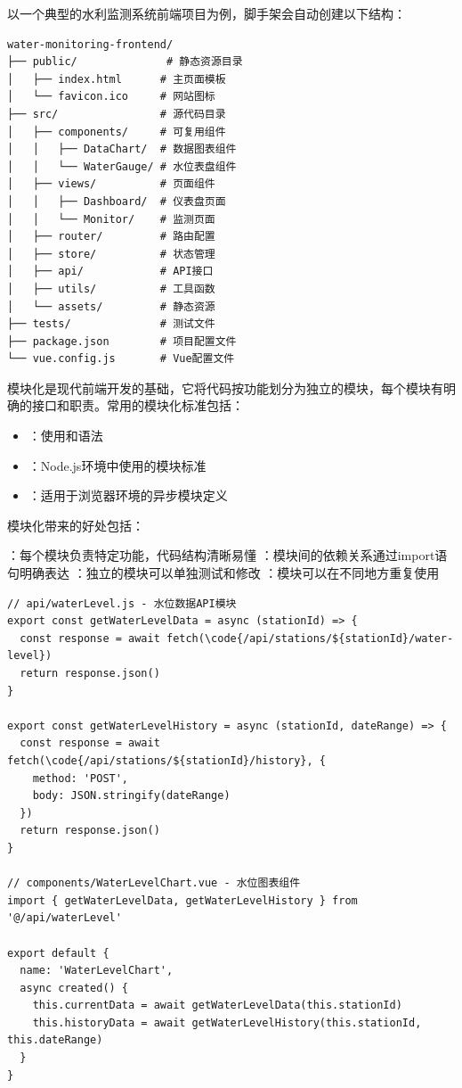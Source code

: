 以一个典型的水利监测系统前端项目为例，脚手架会自动创建以下结构：

\begin{lstlisting}
water-monitoring-frontend/
├── public/              # 静态资源目录
│   ├── index.html      # 主页面模板
│   └── favicon.ico     # 网站图标
├── src/                # 源代码目录
│   ├── components/     # 可复用组件
│   │   ├── DataChart/  # 数据图表组件
│   │   └── WaterGauge/ # 水位表盘组件
│   ├── views/          # 页面组件
│   │   ├── Dashboard/  # 仪表盘页面
│   │   └── Monitor/    # 监测页面
│   ├── router/         # 路由配置
│   ├── store/          # 状态管理
│   ├── api/            # API接口
│   ├── utils/          # 工具函数
│   └── assets/         # 静态资源
├── tests/              # 测试文件
├── package.json        # 项目配置文件
└── vue.config.js       # Vue配置文件
\end{lstlisting}


模块化是现代前端开发的基础，它将代码按功能划分为独立的模块，每个模块有明确的接口和职责。常用的模块化标准包括：

\begin{itemize}
\tightlist
\item
  ：使用和语法
\item
  ：Node.js环境中使用的模块标准
\item
  ：适用于浏览器环境的异步模块定义
\end{itemize}

模块化带来的好处包括：

：每个模块负责特定功能，代码结构清晰易懂 ：模块间的依赖关系通过import语句明确表达 ：独立的模块可以单独测试和修改 ：模块可以在不同地方重复使用

\begin{lstlisting}[style=javascript]
// api/waterLevel.js - 水位数据API模块
export const getWaterLevelData = async (stationId) => {
  const response = await fetch(\code{/api/stations/${stationId}/water-level})
  return response.json()
}

export const getWaterLevelHistory = async (stationId, dateRange) => {
  const response = await fetch(\code{/api/stations/${stationId}/history}, {
    method: 'POST',
    body: JSON.stringify(dateRange)
  })
  return response.json()
}

// components/WaterLevelChart.vue - 水位图表组件
import { getWaterLevelData, getWaterLevelHistory } from '@/api/waterLevel'

export default {
  name: 'WaterLevelChart',
  async created() {
    this.currentData = await getWaterLevelData(this.stationId)
    this.historyData = await getWaterLevelHistory(this.stationId, this.dateRange)
  }
}
\end{lstlisting}


